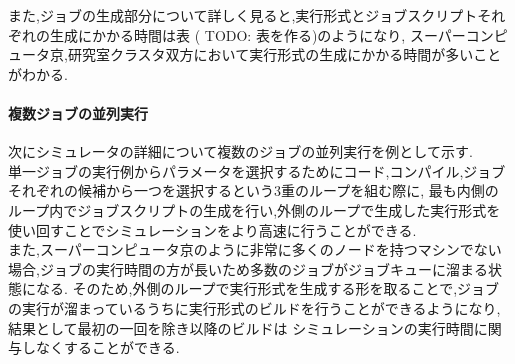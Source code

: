 また,ジョブの生成部分について詳しく見ると,実行形式とジョブスクリプトそれぞれの生成にかかる時間は表 ( TODO: 表を作る)のようになり,
スーパーコンピュータ京,研究室クラスタ双方において実行形式の生成にかかる時間が多いことがわかる.\\

\paragraph{複数ジョブの並列実行}
次にシミュレータの詳細について複数のジョブの並列実行を例として示す.\\

単一ジョブの実行例からパラメータを選択するためにコード,コンパイル,ジョブそれぞれの候補から一つを選択するという3重のループを組む際に,
最も内側のループ内でジョブスクリプトの生成を行い,外側のループで生成した実行形式を使い回すことでシミュレーションをより高速に行うことができる.\\
また,スーパーコンピュータ京のように非常に多くのノードを持つマシンでない場合,ジョブの実行時間の方が長いため多数のジョブがジョブキューに溜まる状態になる.
そのため,外側のループで実行形式を生成する形を取ることで,ジョブの実行が溜まっているうちに実行形式のビルドを行うことができるようになり,結果として最初の一回を除き以降のビルドは
シミュレーションの実行時間に関与しなくすることができる.\\

